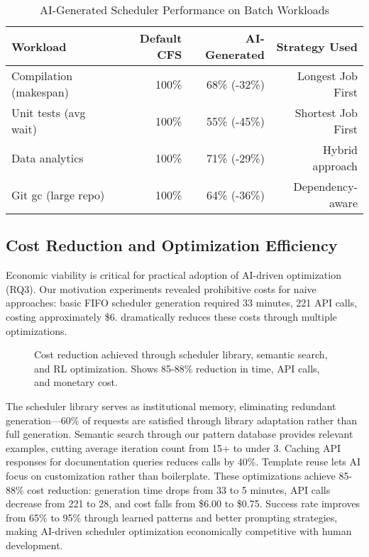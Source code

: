 \begin{table}[h]
\caption{AI-Generated Scheduler Performance on Batch Workloads}
\label{tab:batch-results}
\begin{tabular}{lrrr}
\toprule
Workload & Default CFS & AI-Generated & Strategy Used \\
\midrule
Compilation (makespan) & 100\% & 68\% (-32\%) & Longest Job First \\
Unit tests (avg wait) & 100\% & 55\% (-45\%) & Shortest Job First \\
Data analytics & 100\% & 71\% (-29\%) & Hybrid approach \\
Git gc (large repo) & 100\% & 64\% (-36\%) & Dependency-aware \\
\bottomrule
\end{tabular}
\end{table}

\subsection{Cost Reduction and Optimization Efficiency}

Economic viability is critical for practical adoption of AI-driven optimization (RQ3). Our motivation experiments revealed prohibitive costs for naive approaches: basic FIFO scheduler generation required 33 minutes, 221 API calls, costing approximately \$6. \sys dramatically reduces these costs through multiple optimizations.

\begin{figure}[h]
\centering
{}
\caption{Cost reduction achieved through scheduler library, semantic search, and RL optimization. Shows 85-88\% reduction in time, API calls, and monetary cost.}
\label{fig:cost-reduction}
\end{figure}

The scheduler library serves as institutional memory, eliminating redundant generation—60\% of requests are satisfied through library adaptation rather than full generation. Semantic search through our pattern database provides relevant examples, cutting average iteration count from 15+ to under 3. Caching API responses for documentation queries reduces calls by 40\%. Template reuse lets AI focus on customization rather than boilerplate. These optimizations achieve 85-88\% cost reduction: generation time drops from 33 to 5 minutes, API calls decrease from 221 to 28, and cost falls from \$6.00 to \$0.75. Success rate improves from 65\% to 95\% through learned patterns and better prompting strategies, making AI-driven scheduler optimization economically competitive with human development.

